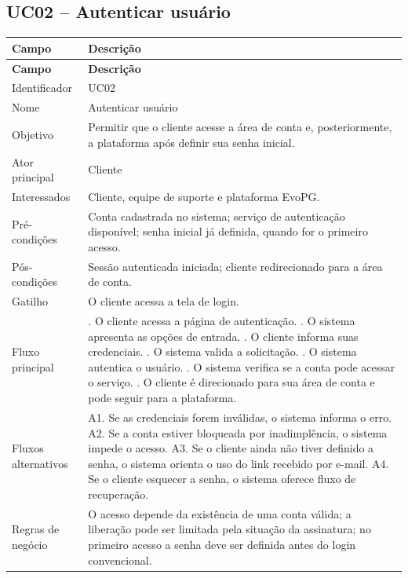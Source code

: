 \documentclass[
  12pt,
  openany,
  oneside,
  a4paper,
  brazil
]{abntex2}
\begin{document}
\subsection{UC02 -- Autenticar usu\'ario}
\begin{longtable}{>{\raggedright\arraybackslash}p{3.3cm} >{\raggedright\arraybackslash}p{10cm}}
\toprule
\textbf{Campo} & \textbf{Descri\c{c}\~ao} \\
\midrule
\endfirsthead
\toprule
\textbf{Campo} & \textbf{Descri\c{c}\~ao} \\
\midrule
\endhead
Identificador & UC02 \\
Nome & Autenticar usu\'ario \\
Objetivo & Permitir que o cliente acesse a \'area de conta e, posteriormente, a plataforma ap\'os definir sua senha inicial. \\
Ator principal & Cliente \\
Interessados & Cliente, equipe de suporte e plataforma EvoPG. \\
Pr\'e-condi\c{c}\~oes & Conta cadastrada no sistema; servi\c{c}o de autentica\c{c}\~ao dispon\'ivel; senha inicial j\'a definida, quando for o primeiro acesso. \\
P\'os-condi\c{c}\~oes & Sess\~ao autenticada iniciada; cliente redirecionado para a \'area de conta. \\
Gatilho & O cliente acessa a tela de login. \\
Fluxo principal & 1. O cliente acessa a p\'agina de autentica\c{c}\~ao. \newline 2. O sistema apresenta as op\c{c}\~oes de entrada. \newline 3. O cliente informa suas credenciais. \newline 4. O sistema valida a solicita\c{c}\~ao. \newline 5. O sistema autentica o usu\'ario. \newline 6. O sistema verifica se a conta pode acessar o servi\c{c}o. \newline 7. O cliente \'e direcionado para sua \'area de conta e pode seguir para a plataforma. \\
Fluxos alternativos & A1. Se as credenciais forem inv\'alidas, o sistema informa o erro. \newline A2. Se a conta estiver bloqueada por inadimpl\^encia, o sistema impede o acesso. \newline A3. Se o cliente ainda n\~ao tiver definido a senha, o sistema orienta o uso do link recebido por e-mail. \newline A4. Se o cliente esquecer a senha, o sistema oferece fluxo de recupera\c{c}\~ao. \\
Regras de neg\'ocio & O acesso depende da exist\^encia de uma conta v\'alida; a libera\c{c}\~ao pode ser limitada pela situa\c{c}\~ao da assinatura; no primeiro acesso a senha deve ser definida antes do login convencional. \\
\bottomrule
\end{longtable}
\end{document}
